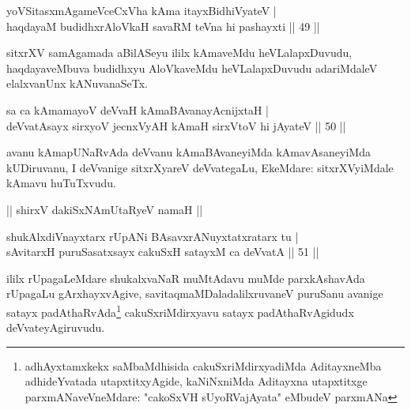 
\begin{shl}
yoVSitasxmAgameVceCxVha kAma itayxBidhiVyateV |\\
haqdayaM budidhxrAloVkaH savaRM teVna hi pashayxti \hfill || 49 ||
\end{shl}

\begin{artha}
sitxrXV samAgamada aBilASeyu ililx kAmaveMdu heVLalapxDuvudu, haqdayaveMbuva budidhxyu AloVkaveMdu heVLalapxDuvudu adariMdaleV elalxvanUnx kANuvanaSeTx.
\end{artha}

\begin{shl}
sa ca kAmamayoV deVvaH kAmaBAvanayA\s cnijxtaH |\\
deVvatA\s sayx sirxyoV jecnxVyAH kAmaH sirxVtoV hi jAyateV \hfill || 50 ||
\end{shl}

\begin{artha}
avanu kAmapUNaRvAda deVvanu kAmaBAvaneyiMda kAmavAsaneyiMda kUDiruvanu, I deVvanige sitxrXyareV deVvategaLu, EkeMdare: sitxrXVyiMdale kAmavu huTuTxvudu.
\end{artha}



\begin{center}%
|| shirxV dakiSxNAmUtaRyeV namaH ||
\end{center}


\begin{shl}
shukAlxdiVnayxtarx rUpANi BAsavxrANuyxtatxratarx tu |\\
sAvitarxH puruSasatxsayx cakuSxH satayxM ca deVvatA \hfill || 51 ||
\end{shl}

\begin{artha}
ililx rUpagaLeMdare shukalxvaNaR muMtAdavu muMde parxkAshavAda rUpagaLu gArxhayxvAgive, savitaqmaMDaladalilxruvaneV puruSanu avanige satayx padAthaRvAda\footnote[1]{adhAyxtamxkekx saMbaMdhisida cakuSxriMdirxyadiMda AditayxneMba adhideYvatada utapxtitxyAgide, kaNiNxniMda Aditayxna utapxtitxge parxmANaveVneMdare: "cakoSxVH sUyoRVajAyata" eMbudeV parxmANa} cakuSxriMdirxyavu satayx padAthaRvAgidudx deVvateyAgiruvudu.
\end{artha}

